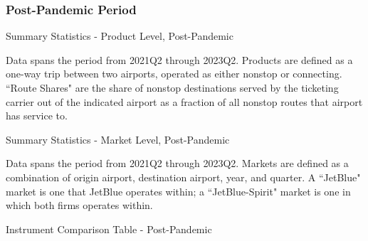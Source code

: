 \documentclass{article}
\begin{document}
\begin{appendices}
	\subsubsection{Post-Pandemic Period}
		\begin{table}
		\caption{Summary Statistics - Product Level, Post-Pandemic}
		\label{tab:SummaryStatistics_Products_Post}
		
		\footnotesize{Data spans the period from 2021Q2 through 2023Q2. Products are defined as a one-way trip between two airports, operated as either nonstop or connecting. ``Route Shares" are the share of nonstop destinations served by the ticketing carrier out of the indicated airport as a fraction of all nonstop routes that airport has service to. }
	\end{table}
	
	\begin{table}
		\caption{Summary Statistics - Market Level, Post-Pandemic}
		\label{tab:SummaryStatistics_Market_Post}
		
		\footnotesize{Data spans the period from 2021Q2 through 2023Q2. Markets are defined as a combination of origin airport, destination airport, year, and quarter. A ``JetBlue" market is one that JetBlue operates within; a ``JetBlue-Spirit" market is one in which both firms operates within. }
	\end{table}
	
	\begin{landscape}
		\begin{table}
			\caption{Instrument Comparison Table - Post-Pandemic}
			\label{tab:Instrument_Compare}
			
		\end{table}
	\end{landscape}


\end{appendices}
\end{document}

